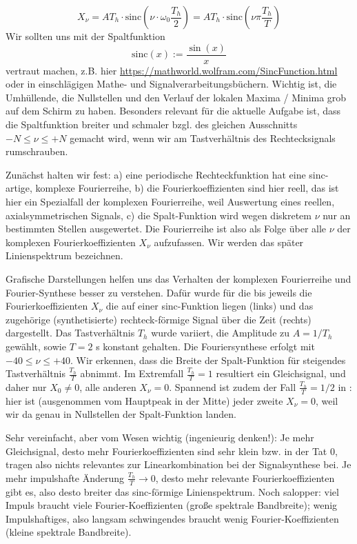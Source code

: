 \begin{Loesung}
%
\begin{equation}
\label{eq:D1483A84E2_Loesung}
 X_\nu = A T_h \cdot \mathrm{sinc}(\nu \cdot \omega_0 \frac{T_h}{2}) = A T_h \cdot \mathrm{sinc}(\nu \pi \frac{T_h}{T})
\end{equation}
%
Wir sollten uns mit der Spaltfunktion
\begin{equation}
\mathrm{sinc}(x) := \frac{\sin(x)}{x}
\end{equation}
vertraut machen, z.B.
hier \url{https://mathworld.wolfram.com/SincFunction.html} oder in einschlägigen
Mathe- und Signalverarbeitungsbüchern. Wichtig ist, die Umhüllende, die Nullstellen
und den Verlauf der lokalen Maxima / Minima grob auf dem Schirm zu haben.
%
Besonders relevant für die aktuelle Aufgabe ist, dass die Spaltfunktion
breiter und schmaler bzgl. des gleichen Ausschnitts
$-N \leq \nu \leq +N$ gemacht wird, wenn wir am Tastverhältnis des Rechtecksignals
rumschrauben.

Zunächst halten wir fest: a) eine periodische Rechteckfunktion hat eine sinc-artige,
komplexe Fourierreihe, b) die Fourierkoeffizienten sind hier reell, das ist
hier ein Spezialfall der komplexen Fourierreihe, weil Auswertung eines
reellen, axialsymmetrischen Signals, c) die Spalt-Funktion wird
wegen diskretem $\nu$ nur an bestimmten Stellen ausgewertet.
Die Fourierreihe ist also als Folge
über alle $\nu$ der komplexen Fourierkoeffizienten $X_\nu$ aufzufassen. Wir werden
das später Linienspektrum bezeichnen.

Grafische Darstellungen helfen uns das Verhalten der komplexen Fourierreihe und
Fourier-Synthese besser zu verstehen.
%
Dafür wurde für die  bis 
jeweils die Fourierkoeffizienten $X_\nu$ die auf einer sinc-Funktion liegen (links)
und das zugehörige (synthetisierte) rechteck-förmige Signal über die Zeit
(rechts) dargestellt.
Das Tastverhältnis $T_h$ wurde
variiert, die Amplitude zu $A = 1/T_h$ gewählt, sowie $T=2$ s konstant gehalten.
%
Die Fouriersynthese erfolgt mit $-40 \leq \nu \leq +40$.
%
Wir erkennen, dass die Breite der Spalt-Funktion für steigendes Tastverhältnis
$\frac{T_h}{T}$ abnimmt.
%
Im Extremfall $\frac{T_h}{T} = 1$ resultiert ein Gleichsignal, und daher
nur $X_0 \neq 0$, alle anderen $X_\nu=0$.
%
Spannend ist zudem der Fall $\frac{T_h}{T} = 1/2$ in :
hier ist (ausgenommen vom Hauptpeak in der Mitte) jeder zweite $X_\nu=0$,
weil wir da genau in Nullstellen der Spalt-Funktion landen.

Sehr vereinfacht, aber vom Wesen wichtig (ingenieurig denken!):
Je mehr Gleichsignal, desto mehr Fourierkoeffizienten sind sehr klein bzw. in der Tat $0$,
tragen also nichts relevantes zur Linearkombination bei der Signalsynthese bei.
Je mehr impulshafte Änderung
$\frac{T_h}{T} \to  0$, desto mehr relevante Fourierkoeffizienten gibt es,
also desto breiter das sinc-förmige Linienspektrum.
%
Noch salopper: viel Impuls braucht viele Fourier-Koeffizienten (große spektrale Bandbreite);
wenig Impulshaftiges, also langsam schwingendes braucht wenig Fourier-Koeffizienten
(kleine spektrale Bandbreite).


\end{Loesung}


